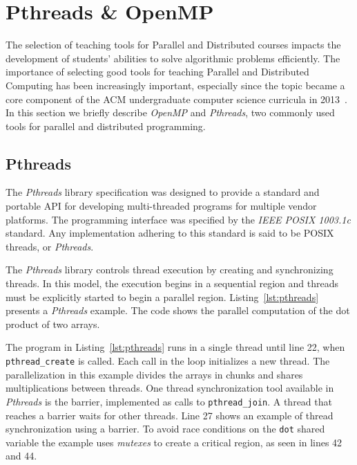 \section{Pthreads \& OpenMP}
\label{sec:apis}

The selection of teaching tools for Parallel and Distributed courses impacts
the development of students' abilities to solve algorithmic problems
efficiently. The importance of selecting good tools for teaching Parallel and
Distributed Computing has been increasingly important, especially since the
topic became a core component of the ACM undergraduate computer science
curricula in 2013~\cite{acmcurricula}.  In this section we briefly describe
\textit{OpenMP} and \textit{Pthreads}, two commonly used tools for parallel and
distributed programming.

\subsection{Pthreads}

The \textit{Pthreads} library specification was designed to provide a standard
and portable API for developing multi-threaded programs for multiple vendor
platforms.  The programming interface was specified by the \textit{IEEE POSIX
1003.1c} standard. Any implementation adhering to this standard is said to be
POSIX threads, or \textit{Pthreads}.

The \textit{Pthreads} library controls thread execution by
creating and synchronizing threads. In this model, the execution begins in a
sequential region and threads must be explicitly started to begin a parallel
region.  Listing~\ref{lst:pthreads} presents a \textit{Pthreads}
example. The code shows the parallel computation of the dot product of two
arrays.

The program in Listing~\ref{lst:pthreads} runs in a single thread until
line 22, when \texttt{pthread\_create} is called.  Each call
in the loop initializes a new thread.
The parallelization in this example divides the arrays in chunks
and shares multiplications between threads.
One thread synchronization tool available in \textit{Pthreads} is the barrier,
implemented as calls to \texttt{pthread\_join}. A thread that reaches a barrier
waits for other threads. Line 27 shows an example of thread synchronization
using a barrier.
To avoid race conditions on the \texttt{dot} shared variable
the example uses \textit{mutexes} to create a critical
region, as seen in lines 42 and 44.

